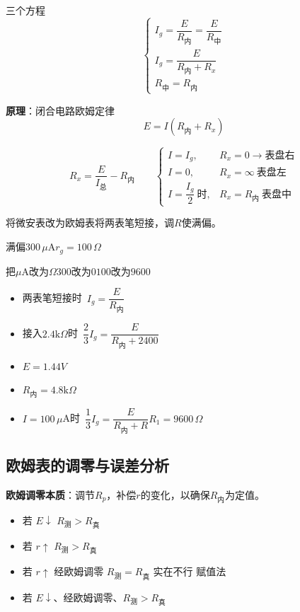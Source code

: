 三个方程
\[
\begin{cases}
I_g=\dfrac{E}{R_{\text{内}}}=\dfrac{E}{R_{\text{中}}}\\[1.2ex]
I_g=\dfrac{E}{R_{\text{内}}+R_x}\\[1.2ex]
R_{\text{中}}=R_{\text{内}}
\end{cases}
\]

\textbf{原理}：闭合电路欧姆定律
\[
E=I(R_{\text{内}}+R_x)
\]


\[
R_x=\frac{E}{I_{\text{总}}}-R_{\text{内}}
\qquad
\begin{cases}
I=I_g, & R_x=0\to\text{表盘右}\\
I=0, & R_x=\infty\ \text{表盘左}\\
I=\dfrac{I_g}{2}\ \text{时}, & R_x=R_{\text{内}}\ \text{表盘中}
\end{cases}
\]

将微安表改为欧姆表\quad 将两表笔短接，调$R$使满偏。

满偏$300\,\mu$A\quad $r_g=100\,\Omega$


把$\mu$A改为$\Omega$\quad $300$改为$0$\quad $100$改为$9600$

\begin{itemize}
\item 两表笔短接时\ $I_g=\dfrac{E}{R_{\text{内}}}$
\item 接入$2.4\mathrm{k}\Omega$时\ $\dfrac{2}{3}I_g=\dfrac{E}{R_{\text{内}}+2400}$
\item $E=1.44\unit{V}$
\item $R_{\text{内}}=4.8\mathrm{k}\Omega$
\item $I=100\,\mu$A时\ $\dfrac{1}{3}I_g=\dfrac{E}{R_{\text{内}}+R}$\quad $R_1=9600\,\Omega$ %
\end{itemize}

\subsection{欧姆表的调零与误差分析}
\textbf{欧姆调零本质}：调节$R_p$，补偿$r$的变化，以确保$R_{\text{内}}$为定值。

\begin{itemize}
\item 若 $E\downarrow$ \qquad\qquad $R_{\text{测}}>R_{\text{真}}$
\item 若 $r\uparrow$ \qquad\qquad $R_{\text{测}}>R_{\text{真}}$
\item 若 $r\uparrow$ 经欧姆调零 $R_{\text{测}}=R_{\text{真}}$ \qquad 实在不行 赋值法
\item 若 $E\downarrow$、经欧姆调零、$R_{\text{测}}>R_{\text{真}}$
\end{itemize}

